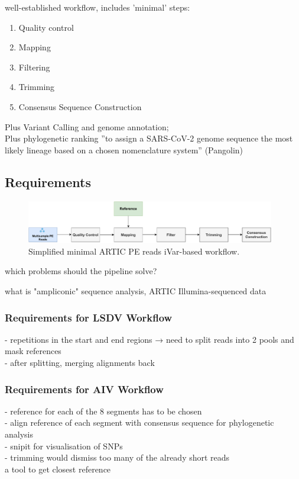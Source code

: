 well-established workflow, includes 'minimal' steps:
\begin{enumerate}
	\item Quality control
	\item Mapping
	\item Filtering
	\item Trimming
	\item Consensus Sequence Construction
\end{enumerate}

Plus Variant Calling and genome annotation; \\
Plus phylogenetic ranking ''to assign a SARS-CoV-2 genome sequence the most likely lineage based on a chosen nomenclature system'' (Pangolin)

\subsection{Requirements}

\begin{figure}
	\centering
	\includegraphics[width=0.97\textwidth]{media/3-pipelines-minimal.pdf}
	\caption{Simplified minimal ARTIC PE reads iVar-based workflow.}
	\label{fig:3-pipelines-minimal}
\end{figure}

which problems should the pipeline solve?

what is "ampliconic" sequence analysis, ARTIC Illumina-sequenced data

\subsubsection{Requirements for LSDV Workflow}
- repetitions in the start and end regions → need to split reads into 2 pools and mask references \\
- after splitting, merging alignments back

\subsubsection{Requirements for AIV Workflow}
- reference for each of the 8 segments has to be chosen \\
- align reference of each segment with consensus sequence for phylogenetic analysis \\
- snipit for visualisation of SNPs \\
- trimming would dismiss too many of the already short reads
\\ a tool to get closest reference

